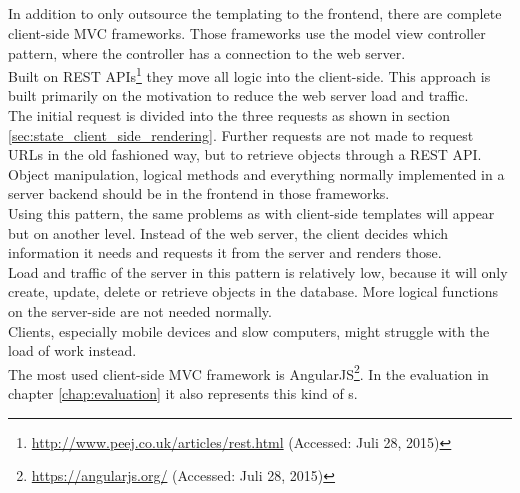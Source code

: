 \subsection{\ClientSideMVC{}\label{sec:state_client_side_mvc}}
In addition to only outsource the templating to the frontend, there are complete client-side MVC frameworks.
Those frameworks use the model view controller pattern, where the controller has a connection to the web server.
\\
Built on REST APIs\footnote{\url{http://www.peej.co.uk/articles/rest.html} (Accessed: Juli 28, 2015)} they move all logic into the client-side.
This approach is built primarily on the motivation to reduce the web server load and traffic.
\\
The initial request is divided into the three requests as shown in section \ref{sec:state_client_side_rendering}.
Further requests are not made to request URLs in the old fashioned way, but to retrieve objects through a REST API. 
Object manipulation, logical methods and everything normally implemented in a server backend should be in the frontend in those frameworks.
\\
Using this pattern, the same problems as with client-side templates will appear but on another level.
Instead of the web server, the client decides which information it needs and requests it from the server and renders those.
\\
Load and traffic of the server in this pattern is relatively low, because it will only create, update, delete or retrieve objects in the database. 
More logical functions on the server-side are not needed normally.
\\
Clients, especially mobile devices and slow computers, might struggle with the load of work instead.
\\
The most used client-side MVC framework is AngularJS\footnote{\url{https://angularjs.org/} (Accessed: Juli 28, 2015)}. In the evaluation in chapter \ref{chap:evaluation} it also represents this kind of \webApplication{}s.

